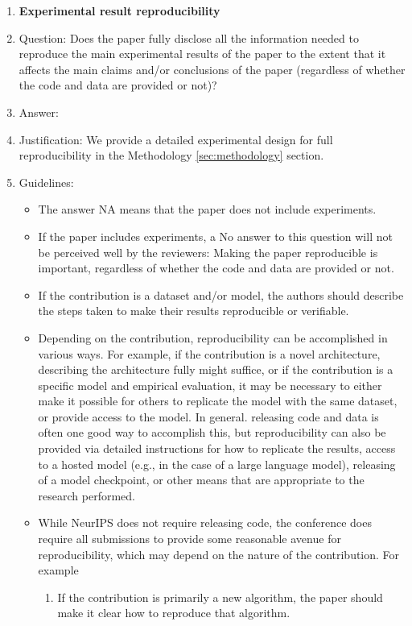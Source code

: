 \documentclass{article}
\begin{document}
\begin{enumerate}
    \item {\bf Experimental result reproducibility}
    \item[] Question: Does the paper fully disclose all the information needed to reproduce the main experimental results of the paper to the extent that it affects the main claims and/or conclusions of the paper (regardless of whether the code and data are provided or not)?
    \item[] Answer: \answerYes{} %
    \item[] Justification: We provide a detailed experimental design for full reproducibility in the Methodology \ref{sec:methodology} section.  
    \item[] Guidelines:
    \begin{itemize}
        \item The answer NA means that the paper does not include experiments.
        \item If the paper includes experiments, a No answer to this question will not be perceived well by the reviewers: Making the paper reproducible is important, regardless of whether the code and data are provided or not.
        \item If the contribution is a dataset and/or model, the authors should describe the steps taken to make their results reproducible or verifiable. 
        \item Depending on the contribution, reproducibility can be accomplished in various ways. For example, if the contribution is a novel architecture, describing the architecture fully might suffice, or if the contribution is a specific model and empirical evaluation, it may be necessary to either make it possible for others to replicate the model with the same dataset, or provide access to the model. In general. releasing code and data is often one good way to accomplish this, but reproducibility can also be provided via detailed instructions for how to replicate the results, access to a hosted model (e.g., in the case of a large language model), releasing of a model checkpoint, or other means that are appropriate to the research performed.
        \item While NeurIPS does not require releasing code, the conference does require all submissions to provide some reasonable avenue for reproducibility, which may depend on the nature of the contribution. For example
        \begin{enumerate}
            \item If the contribution is primarily a new algorithm, the paper should make it clear how to reproduce that algorithm.

\end{enumerate}
\end{itemize}
\end{enumerate}
\end{document}
